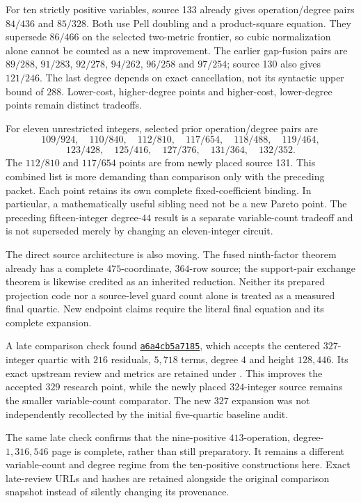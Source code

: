 For ten strictly positive variables, source 133 already gives
operation/degree pairs $84/436$ and $85/328$. Both use Pell doubling and a
product-square equation. They supersede $86/466$ on the selected two-metric
frontier, so cubic normalization alone cannot be counted as a new improvement.
The earlier gap-fusion pairs are $89/288$, $91/283$, $92/278$,
$94/262$, $96/258$ and $97/254$; source 130 also gives $121/246$.
The last degree depends on exact cancellation, not its syntactic upper bound
of $288$. Lower-cost, higher-degree points and higher-cost, lower-degree
points remain distinct tradeoffs.

For eleven unrestricted integers, selected prior operation/degree pairs are
\[
 109/924,\quad110/840,\quad112/810,\quad117/654,\quad
 118/488,\quad119/464,
\]
\[
 123/428,\quad125/416,\quad127/376,\quad131/364,\quad132/352.
\]
The $112/810$ and $117/654$ points are from newly placed source 131.
This combined list is more demanding than comparison only with the preceding
packet. Each point retains its own complete fixed-coefficient binding.
In particular, a mathematically useful sibling need not be a new Pareto point.
The preceding fifteen-integer degree-$44$ result is a separate variable-count
tradeoff and is not superseded merely by changing an eleven-integer circuit.

The direct source architecture is also moving. The fused ninth-factor theorem
already has a complete $475$-coordinate, $364$-row source; the support-pair
exchange theorem is likewise credited as an inherited reduction.
Neither its prepared projection code nor a source-level guard count alone
is treated as a measured final quartic. New endpoint claims require the
literal final equation and its complete expansion.


A late comparison check found
\href{https://github.com/VladimirReshetnikov/ProveIt/commit/a6a4cb5a7185f9c5c736c0cc04b7bb892a1fa5ca}{\texttt{a6a4cb5a7185}},
which accepts the centered $327$-integer quartic with $216$ residuals,
$5,718$ terms, degree $4$ and height $128,446$. Its exact upstream review
and metrics are retained under . This improves the
accepted $329$ research point, while the newly placed $324$-integer source
remains the smaller variable-count comparator. The new $327$ expansion was
not independently recollected by the initial five-quartic baseline audit.

The same late check confirms that the nine-positive $413$-operation,
degree-$1,316,546$ page is complete, rather than still preparatory.
It remains a different variable-count and degree regime from the ten-positive
constructions here. Exact late-review URLs and hashes are retained alongside
the original comparison snapshot instead of silently changing its provenance.


